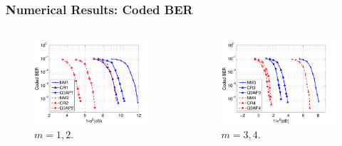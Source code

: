 \documentclass{beamer}
\begin{document}
\begin{frame}
  \frametitle{Numerical Results: Coded BER}
  \begin{columns}
    \begin{figure}
      \includegraphics[width=1.0\textwidth]{figs/waterfall_64QAM_Q3AP_12.pdf}
      \caption{$m=1,2$.}
    \end{figure}
    
    \begin{figure}
      \includegraphics[width=1.0\textwidth]{figs/waterfall_64QAM_Q3AP_34.pdf}
      \caption{$m=3,4$.}
    \end{figure}
  \end{columns}
\end{frame}
\end{document}
